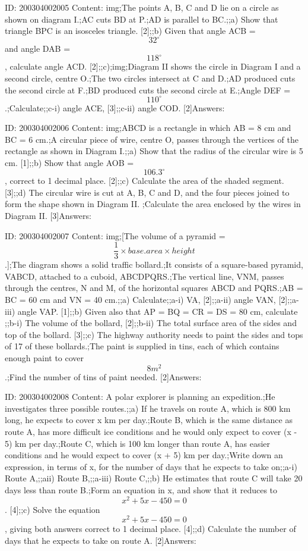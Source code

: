 \documentclass{article}
\begin{document}
ID: 200304002005
Content:
img;The points A, B, C and D lie on a circle as shown on diagram I.;AC cuts BD at P.;AD is parallel to BC.;;a) Show that triangle BPC is an isosceles triangle.   [2];;b) Given that angle ACB = $$32^{\circ}$$ and angle DAB = $$118^{\circ}$$, calculate angle ACD.   [2];;c);img;Diagram II shows the circle in Diagram I and a second circle, centre O.;The two circles intersect at C and D.;AD produced cuts the second circle at F.;BD produced cuts the second circle at E.;Angle DEF = $$110^{\circ}$$.;Calculate;;c-i) angle ACE,   [3];;c-ii) angle COD.   [2]Answers:

ID: 200304002006
Content:
img;ABCD is a rectangle in which AB = 8 cm and BC = 6 cm.;A circular piece of wire, centre O, passes through the vertices of the rectangle as shown in Diagram I.;;a) Show that the radius of the circular wire is 5 cm.   [1];;b) Show that angle AOB = $$106.3^{\circ}$$, correct to 1 decimal place.   [2];;c) Calculate the area of the shaded segment.   [3];;d) The circular wire is cut at A, B, C and D, and the four pieces joined to form the shape shown in Diagram II. ;Calculate the area enclosed by the wires in Diagram II.   [3]Answers:

ID: 200304002007
Content:
img;[The volume of a pyramid = $$\frac{1}{3} \times base.area \times height$$.];The diagram shows a solid traffic bollard.;It consists of a square-based pyramid, VABCD, attached to a cuboid, ABCDPQRS.;The vertical line, VNM, passes through the centres, N and M, of the horizontal squares ABCD and PQRS.;AB = BC = 60 cm and VN = 40 cm.;;a) Calculate;;a-i) VA,   [2];;a-ii) angle VAN,   [2];;a-iii) angle VAP.   [1];;b) Given also that AP = BQ = CR = DS = 80 cm, calculate ;;b-i) The volume of the bollard,   [2];;b-ii) The total surface area of the sides and top of the bollard.   [3];;c) The highway authority needs to paint the sides and tops of 17 of these bollards.;The paint is supplied in tins, each of which contains enough paint to cover $$8 m^2$$.;Find the number of tins of paint needed.   [2]Answers:

ID: 200304002008
Content:
A polar explorer is planning an expedition.;He investigates three possible routes.;;a) If he travels on route A, which is 800 km long, he expects to cover x km per day.;Route B, which is the same distance as route A, has more difficult ice conditions and he would only expect to cover (x - 5) km per day.;Route C, which is 100 km longer than route A, has easier conditions and he would expect to cover (x + 5) km per day.;Write down an expression, in terms of x, for the number of days that he expects to take on;;a-i) Route A,;;aii) Route B,;;a-iii) Route C,;;b) He estimates that route C will take 20 days less than route B.;Form an equation in x, and show that it reduces to $$x^2 + 5x - 450 = 0$$. [4];;c) Solve the equation $$x^2 + 5x - 450 = 0$$, giving both answers correct to 1 decimal place.   [4];;d) Calculate the number of days that he expects to take on route A.   [2]Answers:
\end{document}

